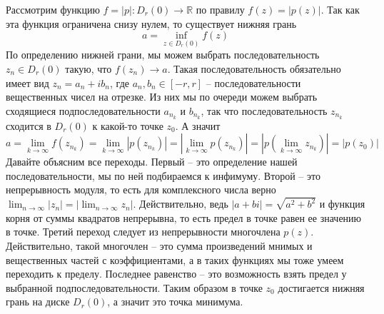 Рассмотрим функцию $f = |p|\colon D_r(0)\to \mathbb R$ по правилу $f(z) = |p(z)|$.
Так как эта функция ограничена снизу нулем, то существует нижняя грань
\[
a = \inf_{z\in D_r(0)} f(z)
\]
По определению нижней грани, мы можем выбрать последовательность $z_n\in D_r(0)$ такую, что $f(z_n) \to a$.
Такая последовательность обязательно имеет вид $z_n = a_n + i b_n$, где $a_n, b_n\in [-r, r]$ -- последовательности вещественных чисел на отрезке.
Из них мы по очереди можем выбрать сходящиеся подпоследовательности $a_{n_k}$ и $b_{n_k}$, так что последовательность $z_{n_k}$ сходится в $D_r(0)$ к какой-то точке $z_0$.
А значит
\[
a = \lim_{k\to \infty} f(z_{n_k}) = \lim_{k\to \infty} |p(z_{n_k})| = \left|\lim_{k\to \infty} p(z_{n_k})\right| = \left|p\left(\lim_{k\to \infty} z_{n_k}\right)\right| = |p(z_0)|
\]
Давайте объясним все переходы.
Первый -- это определение нашей последовательности, мы по ней подбираемся к инфимуму.
Второй -- это непрерывность модуля, то есть для комплексного числа верно $\lim_{n\to \infty}|z_n| = |\lim_{n\to \infty} z_n|$.
Действительно, ведь $|a + bi| = \sqrt{a^2 + b^2}$ и функция корня от суммы квадратов непрерывна, то есть предел в точке равен ее значению в точке.
Третий переход следует из непрерывности многочлена $p(z)$.
Действительно, такой многочлен -- это сумма произведений мнимых и вещественных частей с коэффициентами, а в таких функциях мы тоже умеем переходить к пределу.
Последнее равенство -- это возможность взять предел у выбранной подпоследовательности.
Таким образом в точке $z_0$ достигается нижняя грань на диске $D_r(0)$, а значит это точка минимума.

